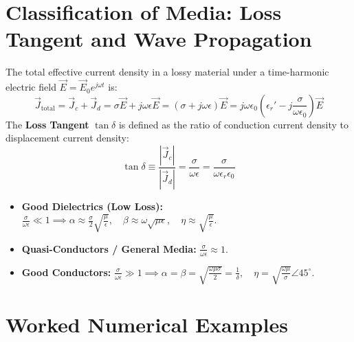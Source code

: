 \section{Classification of Media: Loss Tangent and Wave Propagation}
The total effective current density in a lossy material under a time-harmonic electric field $\vec{E} = \vec{E}_0 e^{j\omega t}$ is:
\begin{equation}
\vec{J}_{\text{total}} = \vec{J}_c + \vec{J}_d = \sigma \vec{E} + j\omega\epsilon \vec{E} = (\sigma + j\omega\epsilon)\vec{E} = j\omega\epsilon_0\left( \epsilon_r' - j\frac{\sigma}{\omega\epsilon_0} \right)\vec{E}
\end{equation}
The \textbf{Loss Tangent} $\tan\delta$ is defined as the ratio of conduction current density to displacement current density:
\begin{equation}
\tan\delta \equiv \frac{|\vec{J}_c|}{|\vec{J}_d|} = \frac{\sigma}{\omega\epsilon} = \frac{\sigma}{\omega \epsilon_r \epsilon_0}
\end{equation}
\begin{itemize}[leftmargin=*,itemsep=2pt]
    \item \textbf{Good Dielectrics (Low Loss):} $\frac{\sigma}{\omega\epsilon} \ll 1 \implies \alpha \approx \frac{\sigma}{2}\sqrt{\frac{\mu}{\epsilon}}, \quad \beta \approx \omega\sqrt{\mu\epsilon}, \quad \eta \approx \sqrt{\frac{\mu}{\epsilon}}$.
    \item \textbf{Quasi-Conductors / General Media:} $\frac{\sigma}{\omega\epsilon} \approx 1$.
    \item \textbf{Good Conductors:} $\frac{\sigma}{\omega\epsilon} \gg 1 \implies \alpha = \beta = \sqrt{\frac{\omega\mu\sigma}{2}} = \frac{1}{\delta}, \quad \eta = \sqrt{\frac{\omega\mu}{\sigma}}\angle 45^\circ$.
\end{itemize}

\section{Worked Numerical Examples}

